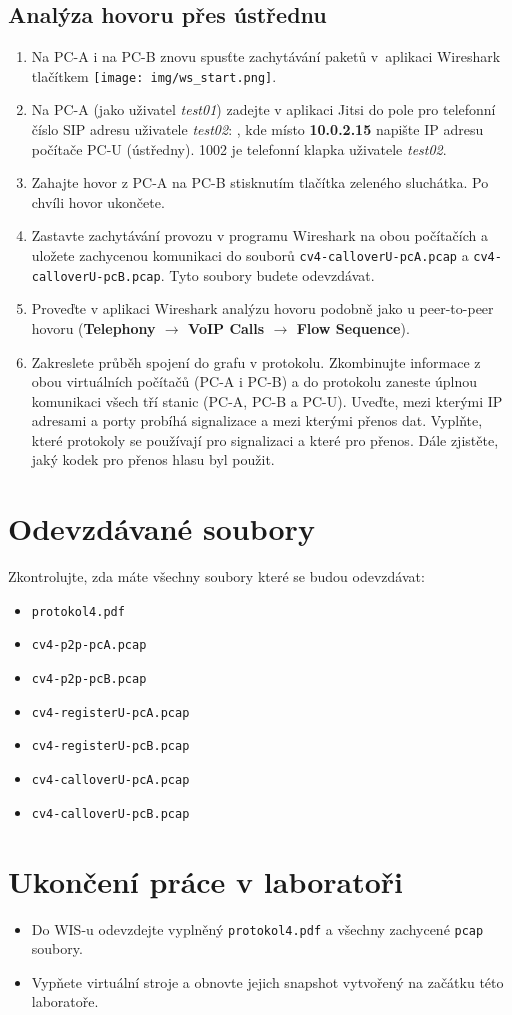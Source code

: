 \subsection{Analýza hovoru přes ústřednu}
\begin{enumerate}
    \item Na PC-A i na PC-B znovu spusťte zachytávání paketů v aplikaci Wireshark tlačítkem \texttt{[image: img/ws\_start.png]}.
    \item Na PC-A (jako uživatel \emph{test01}) zadejte v aplikaci Jitsi do pole pro telefonní číslo SIP adresu uživatele \emph{test02}: , kde místo {\bf 10.0.2.15} napište IP adresu počítače PC-U (ústředny). 1002 je telefonní klapka uživatele \emph{test02}.
    \item Zahajte hovor z PC-A na PC-B stisknutím tlačítka zeleného sluchátka. Po chvíli hovor ukončete.
	\item Zastavte zachytávání provozu v programu Wireshark na obou počítačích a uložete zachycenou komunikaci do souborů \texttt{cv4-calloverU-pcA.pcap} a \texttt{cv4-calloverU-pcB.pcap}. Tyto soubory budete odevzdávat.
	\item Proveďte v aplikaci Wireshark analýzu hovoru podobně jako u peer-to-peer hovoru ({\bf Telephony $\rightarrow$ VoIP Calls $\rightarrow$ \bf Flow Sequence}).
    \item Zakreslete průběh spojení do grafu v protokolu. Zkombinujte informace z obou virtuálních počítačů (PC-A i PC-B) a do protokolu zaneste úplnou komunikaci všech
      tří stanic (PC-A, PC-B a PC-U). Uveďte, mezi kterými IP adresami a porty probíhá signalizace a mezi kterými přenos dat. Vyplňte, které protokoly se používají pro signalizaci a které pro přenos. Dále zjistěte, jaký kodek pro přenos hlasu byl použit.
\end{enumerate}


\section*{Odevzdávané soubory}
Zkontrolujte, zda máte všechny soubory které se budou odevzdávat:
\begin{itemize}
  \item \texttt{protokol4.pdf}
  \item \texttt{cv4-p2p-pcA.pcap}
  \item \texttt{cv4-p2p-pcB.pcap}
  \item \texttt{cv4-registerU-pcA.pcap}
  \item \texttt{cv4-registerU-pcB.pcap}
  \item \texttt{cv4-calloverU-pcA.pcap}
  \item \texttt{cv4-calloverU-pcB.pcap}
\end{itemize}

\section*{Ukončení práce v laboratoři}
\begin{itemize}
	\item Do WIS-u odevzdejte vyplněný \texttt{protokol4.pdf} a všechny zachycené \texttt{pcap} soubory.
	\item Vypňete virtuální stroje a obnovte jejich snapshot vytvořený na začátku této laboratoře.
\end{itemize}
